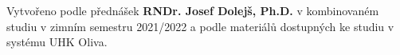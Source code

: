 \epigraph{Vytvořeno podle přednášek \textbf{RNDr. Josef Dolejš, Ph.D.} v kombinovaném studiu v zimním semestru 2021/2022 a podle materiálů dostupných ke studiu v systému UHK Oliva.}{}